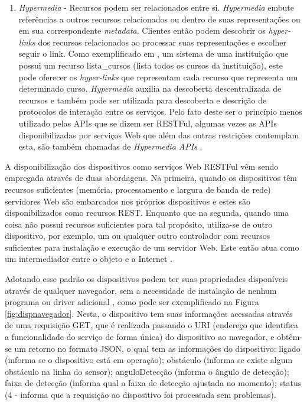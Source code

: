\begin{enumerate}
\item \textit{Hypermedia} - Recursos podem ser relacionados entre si. \textit{Hypermedia} embute referências a outros recursos relacionados ou dentro de suas representações ou em sua correspondente \textit{metadata}. Clientes então podem descobrir os \textit{hyper-links} dos recursos relacionados ao processar suas representações e escolher seguir o link. Como exemplificado em \cite{Franca:2011}, um sistema de uma instituição que possui um recurso lista\_cursos (lista todos os cursos da instituição), este pode oferecer os \textit{hyper-links} que representam cada recurso que representa um determinado curso. \textit{Hypermedia} auxilia na descoberta descentralizada de recursos e também pode ser utilizada para descoberta e descrição de protocolos de interação entre os serviços. Pelo fato deste ser o princípio menos utilizado pelas APIs que se dizem ser RESTFul, algumas vezes as APIs disponibilizadas por serviços Web que além das outras restrições contemplam esta, são também chamadas de \textit{Hypermedia APIs} \cite{Pautasso:2014}.
\end{enumerate}

A disponibilização dos dispositivos como serviços Web RESTFul vêm sendo empregada através de duas abordagens. Na primeira, quando os dispositivos têm recursos suficientes (memória, processamento e largura de banda de rede) servidores Web são embarcados nos próprios dispositivos e estes são disponibilizados como recursos REST. Enquanto que na segunda, quando uma coisa não possui recursos suficientes para tal propósito, utiliza-se de outro dispositivo, por exemplo, um  ou qualquer outro controlador com recursos suficientes para instalação e execução de um servidor Web. Este então atua como um intermediador entre o objeto e a Internet \cite{Franca:2011}.

Adotando esse padrão os dispositivos podem ter suas propriedades disponíveis através de qualquer navegador, sem a necessidade de instalação de nenhum programa ou driver adicional \cite{Roy:2015}, como pode ser exemplificado na Figura \ref{fig:dispnavegador}. Nesta, o dispositivo tem suas informações acessadas através de uma requisição GET, que é realizada passando o URI (endereço que identifica a funcionalidade do serviço de forma única) do dispositivo ao navegador, e obtêm-se um retorno no formato JSON\footnotemark {}, o qual tem as informações do dispositivo: ligado (informa se o dispositivo está em operação); obstáculo (informa se existe algum obstáculo na linha do sensor); anguloDetecção (informa o ângulo de detecção); faixa de detecção (informa qual a faixa de detecção ajustada no momento); status (4 - informa que a requisição ao dispositivo foi processada sem problemas).

